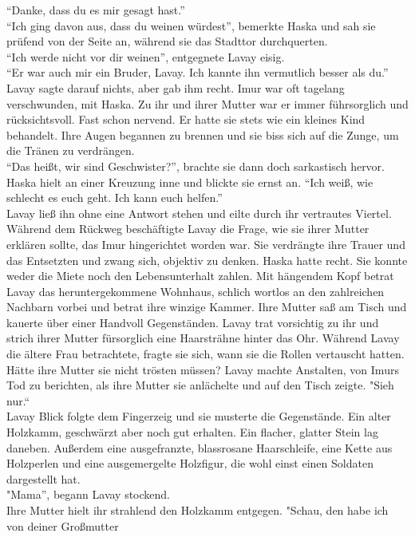 ``Danke, dass du es mir gesagt hast.''\\
``Ich ging davon aus, dass du weinen würdest'', bemerkte Haska und sah sie prüfend von der Seite 
an, während sie das Stadttor durchquerten.\\
``Ich werde nicht vor dir weinen'', entgegnete Lavay eisig. \\
``Er war auch mir ein Bruder, Lavay. Ich kannte ihn vermutlich besser als du.''\\
Lavay sagte darauf nichts, aber gab ihm recht. Imur war oft tagelang verschwunden, mit Haska. Zu 
ihr und ihrer Mutter war er immer führsorglich und rücksichtsvoll. Fast schon nervend. Er hatte sie 
stets wie ein kleines Kind behandelt. Ihre Augen begannen zu brennen und sie biss sich auf die 
Zunge, um die Tränen zu verdrängen.\\
``Das heißt, wir sind Geschwister?'', brachte sie dann doch sarkastisch hervor.\\
Haska hielt an einer Kreuzung inne und blickte sie ernst an. ``Ich weiß, wie schlecht es euch geht. 
Ich kann euch helfen.''\\
Lavay ließ ihn ohne eine Antwort stehen und eilte durch ihr vertrautes Viertel. Während dem Rückweg 
beschäftigte Lavay die Frage, wie sie ihrer Mutter erklären sollte, das Imur hingerichtet worden 
war. Sie verdrängte ihre Trauer und das Entsetzten und zwang sich, objektiv zu denken. Haska hatte 
recht. Sie konnte weder die Miete noch den Lebensunterhalt zahlen. Mit hängendem Kopf betrat Lavay 
das heruntergekommene Wohnhaus, schlich wortlos an den zahlreichen Nachbarn vorbei und betrat ihre 
winzige Kammer. Ihre Mutter saß am Tisch und kauerte über einer Handvoll Gegenständen. Lavay trat 
vorsichtig zu ihr und strich ihrer Mutter fürsorglich eine Haarsträhne hinter das Ohr. Während Lavay 
die ältere Frau betrachtete, fragte sie sich, wann sie die Rollen vertauscht hatten. Hätte ihre 
Mutter sie nicht trösten müssen? Lavay machte Anstalten, von Imurs Tod zu berichten, als ihre Mutter 
sie anlächelte und auf den Tisch zeigte. "Sieh nur.``\\
Lavay Blick folgte dem Fingerzeig und sie musterte die Gegenstände. Ein alter Holzkamm, geschwärzt 
aber noch gut erhalten. Ein flacher, glatter Stein lag daneben. Außerdem eine ausgefranzte, 
blassrosane Haarschleife, eine Kette aus Holzperlen und eine ausgemergelte Holzfigur, die wohl 
einst einen Soldaten dargestellt hat.\\
"Mama'', begann Lavay stockend.\\
Ihre Mutter hielt ihr strahlend den Holzkamm entgegen. "Schau, den habe ich von deiner Großmutter 
